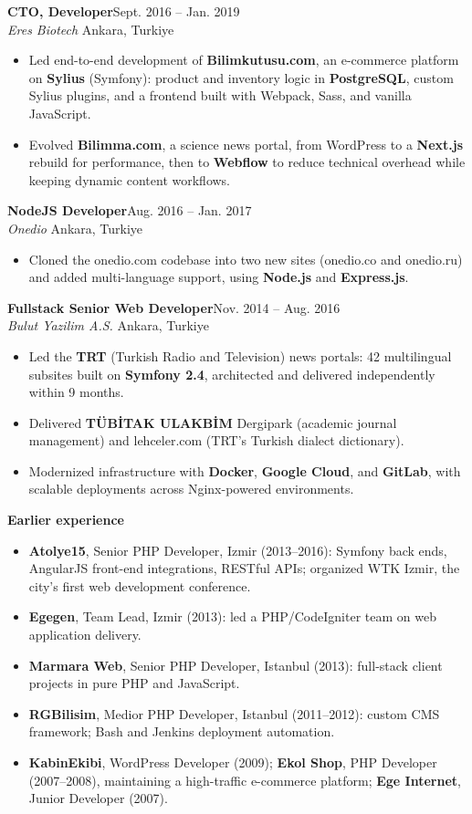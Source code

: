 \documentclass[11pt,a4paper]{article}
\newcommand{\role}[4]{%
  \par\addvspace{5pt}\noindent
  \textbf{#1}\hfill{\small #4}\\
  {\itshape #2}\hfill{\small\color{mutedtext} #3}\par\nopagebreak
}
\begin{document}
\role{CTO, Developer}{Eres Biotech}{Ankara, Turkiye}{Sept. 2016 -- Jan. 2019}
\begin{itemize}
  \item Led end-to-end development of \textbf{Bilimkutusu.com}, an e-commerce platform on \textbf{Sylius}
    (Symfony): product and inventory logic in \textbf{PostgreSQL}, custom Sylius plugins, and a frontend built
    with Webpack, Sass, and vanilla JavaScript.
  \item Evolved \textbf{Bilimma.com}, a science news portal, from WordPress to a \textbf{Next.js} rebuild for
    performance, then to \textbf{Webflow} to reduce technical overhead while keeping dynamic content workflows.
\end{itemize}

\role{NodeJS Developer}{Onedio}{Ankara, Turkiye}{Aug. 2016 -- Jan. 2017}
\begin{itemize}
  \item Cloned the onedio.com codebase into two new sites (onedio.co and onedio.ru) and added multi-language
    support, using \textbf{Node.js} and \textbf{Express.js}.
\end{itemize}

\role{Fullstack Senior Web Developer}{Bulut Yazilim A.S.}{Ankara, Turkiye}{Nov. 2014 -- Aug. 2016}
\begin{itemize}
  \item Led the \textbf{TRT} (Turkish Radio and Television) news portals: 42 multilingual subsites built on
    \textbf{Symfony 2.4}, architected and delivered independently within 9 months.
  \item Delivered \textbf{T\"UB\.ITAK ULAKB\.IM} Dergipark (academic journal management) and lehceler.com
    (TRT's Turkish dialect dictionary).
  \item Modernized infrastructure with \textbf{Docker}, \textbf{Google Cloud}, and \textbf{GitLab}, with
    scalable deployments across Nginx-powered environments.
\end{itemize}

\par\addvspace{6pt}
\noindent\textbf{Earlier experience}
\begin{itemize}[itemsep=0pt]
  \item \textbf{Atolye15}, Senior PHP Developer, Izmir (2013--2016): Symfony back ends, AngularJS front-end
    integrations, RESTful APIs; organized WTK Izmir, the city's first web development conference.
  \item \textbf{Egegen}, Team Lead, Izmir (2013): led a PHP/CodeIgniter team on web application delivery.
  \item \textbf{Marmara Web}, Senior PHP Developer, Istanbul (2013): full-stack client projects in pure PHP and JavaScript.
  \item \textbf{RGBilisim}, Medior PHP Developer, Istanbul (2011--2012): custom CMS framework; Bash and Jenkins deployment automation.
  \item \textbf{KabinEkibi}, WordPress Developer (2009); \textbf{Ekol Shop}, PHP Developer (2007--2008),
    maintaining a high-traffic e-commerce platform; \textbf{Ege Internet}, Junior Developer (2007).
\end{itemize}
\end{document}
